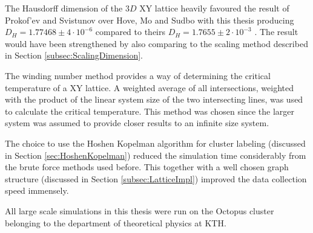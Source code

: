 The Hausdorff dimension of the $3D$ XY lattice heavily favoured the result of Prokof'ev and Svistunov over Hove, Mo and Sudbo with this thesis producing $D_H = 1.77468 \pm 4 \cdot 10^{-6}$ compared to theirs $D_H = 1.7655 \pm 2 \cdot 10^{-3}$ \cite{Prokofev:comment_on_hove_hausdorff_crit_fluct}. The result would have been strengthened by also comparing to the scaling method described in Section \ref{subsec:ScalingDimension}.

The winding number method provides a way of determining the critical temperature of a XY lattice. A weighted average of all intersections, weighted with the product of the linear system size of the two intersecting lines, was used to calculate the critical temperature. This method was chosen since the larger system was assumed to provide closer results to an infinite size system.

The choice to use the Hoshen Kopelman algorithm for cluster labeling (discussed in Section \ref{sec:HoshenKopelman}) reduced the simulation time considerably from the brute force methods used before. This together with a well chosen graph structure (discussed in Section \ref{subsec:LatticeImpl}) improved the data collection speed immensely.

All large scale simulations in this thesis were run on the Octopus cluster belonging to the department of theoretical physics at KTH.



